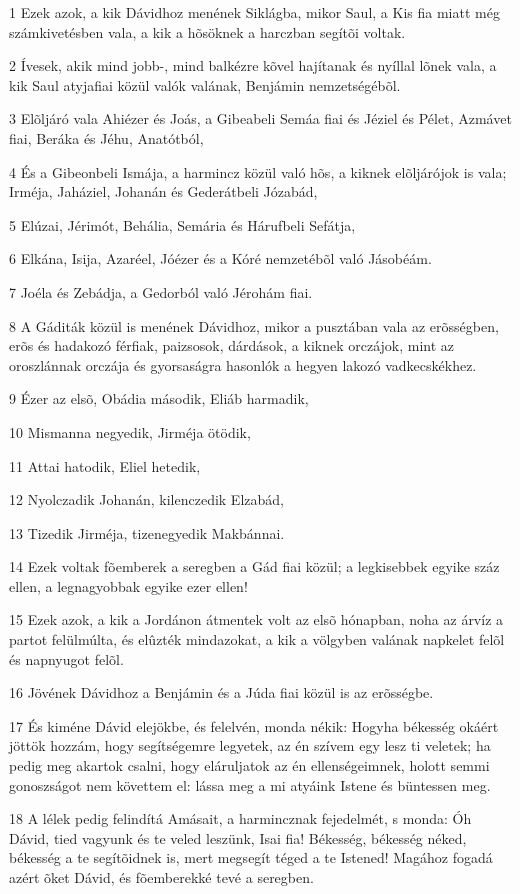 \par 1 Ezek azok, a kik Dávidhoz menének Siklágba, mikor Saul, a Kis fia miatt még számkivetésben vala, a kik a hõsöknek a harczban segítõi voltak.
\par 2 Ívesek, akik mind jobb-, mind balkézre kõvel hajítanak és nyíllal lõnek vala, a kik Saul atyjafiai közül valók valának, Benjámin nemzetségébõl.
\par 3 Elõljáró vala Ahiézer és Joás, a Gibeabeli Semáa fiai és Jéziel és Pélet, Azmávet fiai, Beráka és Jéhu, Anatótból,
\par 4 És a Gibeonbeli Ismája, a harmincz közül való hõs, a kiknek elõljárójok is vala; Irméja, Jaháziel, Johanán és Gederátbeli Józabád,
\par 5 Elúzai, Jérimót, Behália, Semária és Hárufbeli Sefátja,
\par 6 Elkána, Isija, Azaréel, Jóézer és a Kóré nemzetébõl való Jásobéám.
\par 7 Joéla és Zebádja, a Gedorból való Jérohám fiai.
\par 8 A Gáditák közül is menének Dávidhoz, mikor a pusztában vala az erõsségben, erõs és hadakozó férfiak, paizsosok, dárdások, a kiknek orczájok, mint az oroszlánnak orczája és gyorsaságra hasonlók a hegyen lakozó  vadkecskékhez.
\par 9 Ézer az elsõ, Obádia második, Eliáb harmadik,
\par 10 Mismanna negyedik, Jirméja ötödik,
\par 11 Attai hatodik, Eliel hetedik,
\par 12 Nyolczadik Johanán, kilenczedik Elzabád,
\par 13 Tizedik Jirméja, tizenegyedik Makbánnai.
\par 14 Ezek voltak fõemberek a seregben a Gád fiai közül; a legkisebbek egyike száz ellen, a legnagyobbak egyike ezer ellen!
\par 15 Ezek azok, a kik a Jordánon átmentek volt az elsõ hónapban, noha az árvíz a partot felülmúlta, és elûzték mindazokat, a kik a völgyben valának napkelet felõl és napnyugot felõl.
\par 16 Jövének Dávidhoz a Benjámin és a Júda fiai közül is az erõsségbe.
\par 17 És kiméne Dávid elejökbe, és felelvén, monda nékik: Hogyha békesség okáért jöttök hozzám, hogy segítségemre legyetek, az én szívem egy lesz ti veletek; ha pedig meg akartok csalni, hogy eláruljatok az én ellenségeimnek, holott semmi gonoszságot nem követtem el: lássa meg a mi atyáink Istene és büntessen meg.
\par 18 A lélek pedig felindítá Amásait, a harmincznak  fejedelmét, s monda: Óh Dávid, tied vagyunk és te veled leszünk, Isai fia! Békesség, békesség néked, békesség a te segítõidnek is, mert megsegít téged a te Istened! Magához fogadá azért õket Dávid, és fõemberekké tevé a seregben.
